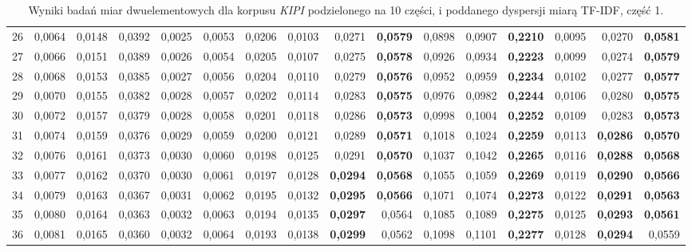 \begin{table}[htp!]
\begin{adjustwidth}{-2cm}{}
\begin{tabular}{ l | *{15}{| r}}
26	&	0,0064	&	0,0148	&	0,0392	&	0,0025	&	0,0053	&	0,0206	&	0,0103	&	0,0271	&	\textbf{0,0579}	&	0,0898	&	0,0907	&	\textbf{0,2210}	&	0,0095	&	0,0270	&	\textbf{0,0581}	\\
27	&	0,0066	&	0,0151	&	0,0389	&	0,0026	&	0,0054	&	0,0205	&	0,0107	&	0,0275	&	\textbf{0,0578}	&	0,0926	&	0,0934	&	\textbf{0,2223}	&	0,0099	&	0,0274	&	\textbf{0,0579}	\\
28	&	0,0068	&	0,0153	&	0,0385	&	0,0027	&	0,0056	&	0,0204	&	0,0110	&	0,0279	&	\textbf{0,0576}	&	0,0952	&	0,0959	&	\textbf{0,2234}	&	0,0102	&	0,0277	&	\textbf{0,0577}	\\
29	&	0,0070	&	0,0155	&	0,0382	&	0,0028	&	0,0057	&	0,0202	&	0,0114	&	0,0283	&	\textbf{0,0575}	&	0,0976	&	0,0982	&	\textbf{0,2244}	&	0,0106	&	0,0280	&	\textbf{0,0575}	\\
30	&	0,0072	&	0,0157	&	0,0379	&	0,0028	&	0,0058	&	0,0201	&	0,0118	&	0,0286	&	\textbf{0,0573}	&	0,0998	&	0,1004	&	\textbf{0,2252}	&	0,0109	&	0,0283	&	\textbf{0,0573}	\\
31	&	0,0074	&	0,0159	&	0,0376	&	0,0029	&	0,0059	&	0,0200	&	0,0121	&	0,0289	&	\textbf{0,0571}	&	0,1018	&	0,1024	&	\textbf{0,2259}	&	0,0113	&	\textbf{0,0286}	&	\textbf{0,0570}	\\
32	&	0,0076	&	0,0161	&	0,0373	&	0,0030	&	0,0060	&	0,0198	&	0,0125	&	0,0291	&	\textbf{0,0570}	&	0,1037	&	0,1042	&	\textbf{0,2265}	&	0,0116	&	\textbf{0,0288}	&	\textbf{0,0568}	\\
33	&	0,0077	&	0,0162	&	0,0370	&	0,0030	&	0,0061	&	0,0197	&	0,0128	&	\textbf{0,0294}	&	\textbf{0,0568}	&	0,1055	&	0,1059	&	\textbf{0,2269}	&	0,0119	&	\textbf{0,0290}	&	\textbf{0,0566}	\\
34	&	0,0079	&	0,0163	&	0,0367	&	0,0031	&	0,0062	&	0,0195	&	0,0132	&	\textbf{0,0295}	&	\textbf{0,0566}	&	0,1071	&	0,1074	&	\textbf{0,2273}	&	0,0122	&	\textbf{0,0291}	&	\textbf{0,0563}	\\
35	&	0,0080	&	0,0164	&	0,0363	&	0,0032	&	0,0063	&	0,0194	&	0,0135	&	\textbf{0,0297}	&	0,0564	&	0,1085	&	0,1089	&	\textbf{0,2275}	&	0,0125	&	\textbf{0,0293}	&	\textbf{0,0561}	\\
36	&	0,0081	&	0,0165	&	0,0360	&	0,0032	&	0,0064	&	0,0193	&	0,0138	&	\textbf{0,0299}	&	0,0562	&	0,1098	&	0,1101	&	\textbf{0,2277}	&	0,0128	&	\textbf{0,0294}	&	0,0559	\\
	\bottomrule
\end{tabular}
 \end{adjustwidth}
\caption[Wyniki badań miar dwuelementowych dla korpusu \emph{KIPI} podzielonego na 10 części, i poddanego dyspersji miarą TF-IDF, część 1]{Wyniki badań miar dwuelementowych dla korpusu \emph{KIPI} podzielonego na 10 części, i poddanego dyspersji miarą TF-IDF, część 1.}
\label{KIPI_TFIDF_10_part_1}
\end{table}


